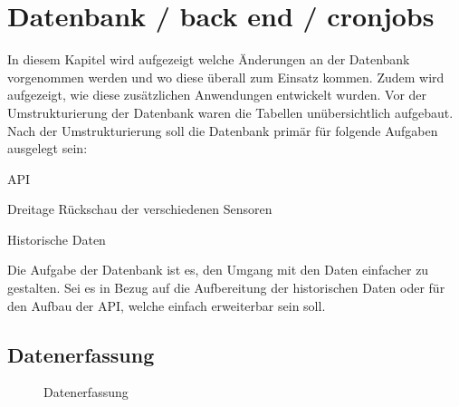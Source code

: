 \section{Datenbank / back end / cronjobs}
In diesem Kapitel wird aufgezeigt welche Änderungen an der Datenbank vorgenommen werden und wo diese überall zum Einsatz kommen. Zudem wird aufgezeigt, wie diese zusätzlichen Anwendungen entwickelt wurden. Vor der Umstrukturierung der Datenbank waren die Tabellen unübersichtlich aufgebaut. Nach der Umstrukturierung soll die Datenbank primär für folgende Aufgaben ausgelegt sein:
\begin{itemize*}
\item API
\item Dreitage Rückschau der verschiedenen Sensoren
\item Historische Daten
\end{itemize*}

Die Aufgabe der Datenbank ist es, den Umgang mit den Daten einfacher zu gestalten. Sei es in Bezug auf die Aufbereitung der historischen Daten oder für den Aufbau der API, welche einfach erweiterbar sein soll.



\subsection{Datenerfassung}

\begin{figure}[htbp!]
	\centering
	\caption{Datenerfassung}
	\label{img:datenerfassung}
\end{figure}




